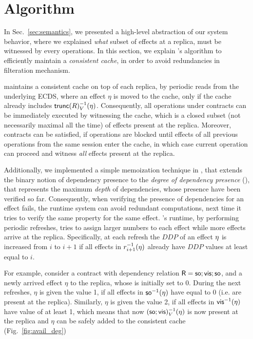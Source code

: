\section{Algorithm}
\label{sec:alg}

In Sec.~\ref{sec:semantics}, we presented a high-level
abstraction of our system behavior, where we explained \emph{what} subset of
effects at a replica, must be witnessed by every operations. In this
section, we explain \tool's algorithm to efficiently maintain a \emph{consistent
cache}, in order to avoid redundancies in filteration mechanism.

\tool maintains a consistent cache on top of each replica, by periodic
reads from the underlying ECDS, where an effect $\eta$ is moved to the
cache, only  if the cache already includes {\footnotesize
$\trunc{R}_V^{-1}(\eta)$}. Consequently, all operations under \UB{}
contracts can be immediately executed
by witnessing the cache, which is a closed subset (not necessarily maximal all the time) 
of effects present at the replica. 
Moreover, \LB{} contracts can be satisfied, if operations are
blocked until effects of all previous operations from the same session enter
the cache, in which case current operation can proceed and witness \emph{all}
effects present at the replica.

Additionally, we implemented a simple memoization technique in \tool,
that extends the binary notion of dependency presence to the
\emph{degree of dependency presence} (\DDP{}), that represents 
the maximum \emph{depth} of dependencies, whose presence have been
verified so far. 
Consequently, when verifying the presence of
dependencies for an effect fails, the runtime system can avoid redundant
computations, next time it tries to verify the same property for the
same effect.
\tool's runtime, by performing
periodic \DDP{} refreshes, tries to assign larger numbers to each effect
while more effects arrive at the replica. 
Specifically, at each refresh the $DDP$ of an effect $\eta$ is increased from $i$ to $i+1$ if
all effects in $r_{i+1}^{-1}(\eta)$ already have $DDP$ values at least
equal to $i$.

For example, consider a contract with dependency relation
${\normalfont \textsf{R}}={\textsf{so}};{\normalfont \textsf{vis}};{\textsf{so}}$, and a newly arrived effect $\eta$ to the
replica, whose \DDP{} is initially set to 0. 
During the next refreshes, $\eta$ is given the value 1, if all
effects in ${\textsf{so}}^{-1}(\eta)$ have \DDP{} equal to 0 (i.e. are present at the
replica). Similarly, $\eta$ is given the value 2, if all effects in
${\normalfont \textsf{vis}}^{-1}(\eta)$ have \DDP{} value of at least 1, which means that now
$({\textsf{so}};{\normalfont \textsf{vis}})^{-1}_V(\eta)$ is now present at the replica and $\eta$ can
be safely added to the consistent cache (Fig.~\ref{fig:avail_deg})

